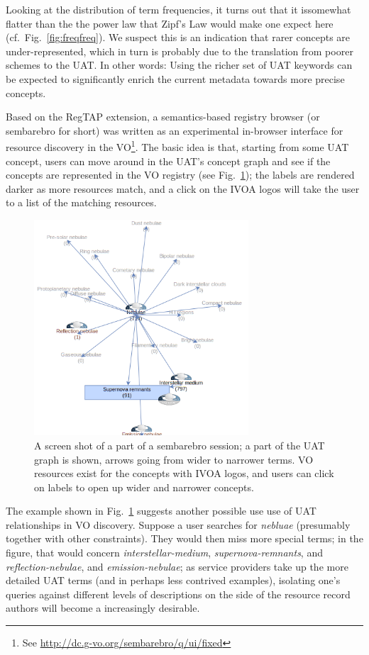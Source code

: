 \documentclass[11pt,a4paper]{ivoa}
\newcommand{\vocterm}[1]{\emph{\color{termcolor}#1}}
\begin{document}
Looking at the distribution of term frequencies, it turns out 
that it issomewhat flatter than the
the power law that Zipf's Law \citep{book:manning} would make one expect
here (cf.~Fig.~\ref{fig:freqfreq}).  We suspect this is an indication
that rarer concepts are under-represented, which in turn is probably due
to the translation from poorer schemes to the UAT.  In other words:
Using the richer set of UAT keywords can be expected to significantly
enrich the current metadata towards more precise concepts.

Based on the RegTAP extension, a semantics-based 
registry browser (or sembarebro for
short) was written as an experimental in-browser interface for resource
discovery in the VO\footnote{See
\url{http://dc.g-vo.org/sembarebro/q/ui/fixed}}.  The basic idea is
that, starting from some UAT concept, users can move around in the
UAT's concept graph and see if the concepts are represented in the VO
registry (see Fig.~\ref{fig:sembarebro}); the labels are 
rendered darker as more
resources match, and a click on the IVOA logos will take the user to a
list of the matching resources.

\begin{figure}
\includegraphics[width=8cm]{sembarebro.png}
\caption{A screen shot of a part of a sembarebro session; a part of the
UAT graph is shown, arrows going from wider to narrower terms.  VO
resources exist for the concepts with IVOA logos, and users can click on
labels to open up wider and narrower concepts.}
\label{fig:sembarebro}
\end{figure}

The example shown in Fig.~\ref{fig:sembarebro} suggests another possible use
use of UAT relationships in VO discovery.  Suppose a user searches 
for \vocterm{nebluae} (presumably together with other constraints).
They would then miss more special terms; in the figure, that would
concern \vocterm{interstellar-medium}, \vocterm{supernova-remnants}, and
\vocterm{reflection-nebulae}, and \vocterm{emission-nebulae}; as service
providers take up the more detailed UAT terms (and in perhaps less
contrived examples), isolating one's queries against different levels
of descriptions on the side of the resource record authors will become a
increasingly desirable.
\end{document}
